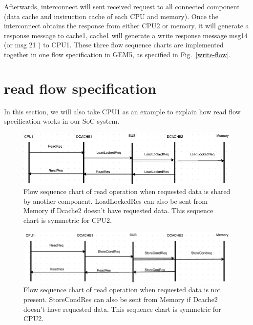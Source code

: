 \documentclass[conference]{IEEEtran}
\begin{document}
 Afterwards, interconnect will sent received request to all connected component (data cache and instruction cache of each CPU and memory). Once the interconnect obtains the response from either CPU2 or memory, it will generate a response message to cache1, cache1 will generate a write response message msg14 (or msg 21 ) to CPU1. These three flow sequence charts are implemented together in one flow specification in GEM5, as specified in Fig.~\ref{write-flow}.
 
 
 \section{read flow specification}
 In this section, we will also take CPU1 as an example to explain how read flow specification works in our SoC system.


 
 \begin{figure} 
 \centerline{
 \includegraphics[width=3.9In]{figures/read3.png}}
 \caption{Flow sequence chart of read operation when requested data is shared by another component. LoadLockedRes can also be sent from Memory if Dcache2 doesn't have requested data. This sequence chart is symmetric for CPU2. }
 \label{read3}
 \end{figure}
 
 \begin{figure} 
 \centerline{
 \includegraphics[width=3.9In]{figures/read2.png}}
 \caption{Flow sequence chart of read operation when requested data is not present. StoreCondRes can also be sent from Memory if Dcache2 doesn't have requested data. This sequence chart is symmetric for CPU2. }
 \label{read2}
 \end{figure}
\end{document}

